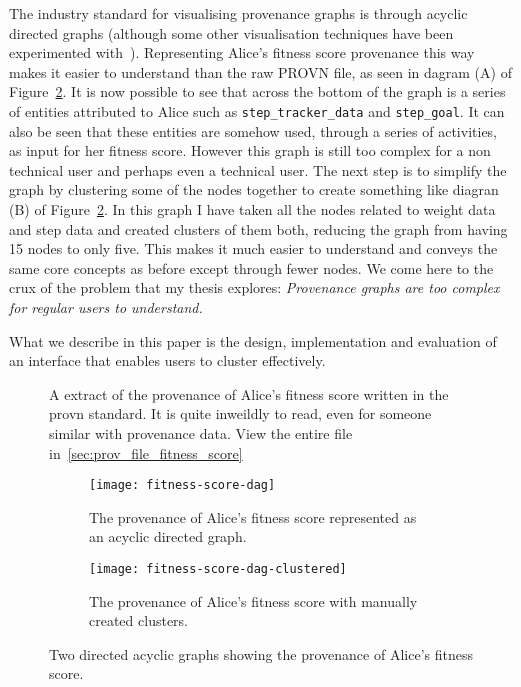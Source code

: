 The industry standard for visualising provenance graphs is through acyclic directed graphs (although some other visualisation techniques have been experimented with~\cite{Borkin2013}). Representing Alice's fitness score provenance this way makes it easier to understand than the raw PROVN file, as seen in dagram (A) of Figure~\ref{fig:fitness-score-dag}. It is now possible to see that across the bottom of the graph is a series of entities attributed to Alice such as \texttt{step\_tracker\_data} and \texttt{step\_goal}. It can also be seen that these entities are somehow used, through a series of activities, as input for her fitness score. However this graph is still too complex for a non technical user and perhaps even a technical user. The next step is to simplify the graph by clustering some of the nodes together to create something like diagran (B) of Figure~\ref{fig:fitness-score-dag}. In this graph I have taken all the nodes related to weight data and step data and created clusters of them both, reducing the graph from having 15 nodes to only five. This makes it much easier to understand and conveys the same core concepts as before except through fewer nodes. We come here to the crux of the problem that my thesis explores: \textit{Provenance graphs are too complex for regular users to understand.}

What we describe in this paper is the design, implementation and evaluation of an interface that enables users to cluster effectively. 
\begin{figure}[b]
	\centering
	
	\caption{A extract of the provenance of Alice's fitness score written in the provn standard. It is quite inweildly to read, even for someone similar with provenance data. View the entire file in~\ref{sec:prov_file_fitness_score}}
	\label{fig:fitness-score-provn}
\end{figure}

\begin{figure}[h]
	\centering
	\begin{subfigure}[t]{\textwidth}
    \centering
	\texttt{[image: fitness-score-dag]}
    \caption{The provenance of Alice's fitness score represented as an acyclic directed graph.}
  \end{subfigure}
  \begin{subfigure}[t]{\textwidth}
    \centering
	\texttt{[image: fitness-score-dag-clustered]}
    \caption{The provenance of Alice's fitness score with manually created clusters.}
  \end{subfigure}

	\caption{Two directed acyclic graphs showing the provenance of Alice's fitness score.}
	\label{fig:fitness-score-dag}
\end{figure}

